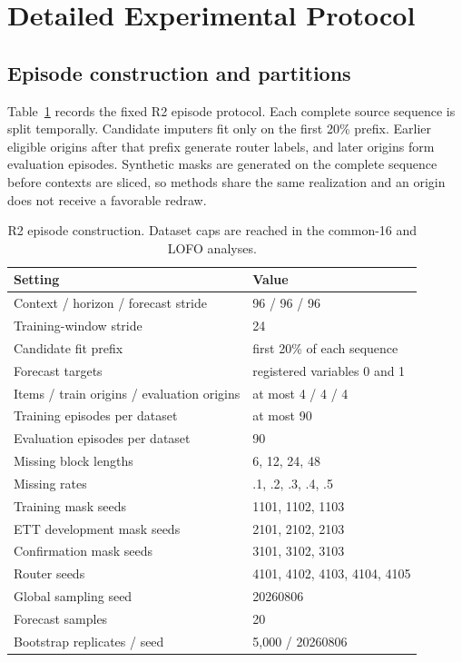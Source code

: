 \section{Detailed Experimental Protocol}
\label{app:protocol}

\subsection{Episode construction and partitions}

Table~\ref{tab:protocol-details} records the fixed R2 episode protocol. Each complete source sequence is split temporally. Candidate imputers fit only on the first 20\% prefix. Earlier eligible origins after that prefix generate router labels, and later origins form evaluation episodes. Synthetic masks are generated on the complete sequence before contexts are sliced, so methods share the same realization and an origin does not receive a favorable redraw.

\begin{table}[h]
\caption{R2 episode construction. Dataset caps are reached in the common-16 and LOFO analyses.}
\label{tab:protocol-details}
\centering
\small
\begin{tabular}{ll}
\toprule
Setting & Value \\
\midrule
Context / horizon / forecast stride & 96 / 96 / 96 \\
Training-window stride & 24 \\
Candidate fit prefix & first 20\% of each sequence \\
Forecast targets & registered variables 0 and 1 \\
Items / train origins / evaluation origins & at most 4 / 4 / 4 \\
Training episodes per dataset & at most 90 \\
Evaluation episodes per dataset & 90 \\
Missing block lengths & 6, 12, 24, 48 \\
Missing rates & .1, .2, .3, .4, .5 \\
Training mask seeds & 1101, 1102, 1103 \\
ETT development mask seeds & 2101, 2102, 2103 \\
Confirmation mask seeds & 3101, 3102, 3103 \\
Router seeds & 4101, 4102, 4103, 4104, 4105 \\
Global sampling seed & 20260806 \\
Forecast samples & 20 \\
Bootstrap replicates / seed & 5,000 / 20260806 \\
\bottomrule
\end{tabular}
\end{table}


